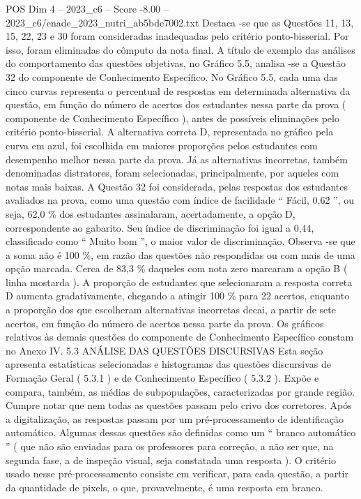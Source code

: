 \begin{textsample}{POS Dim 4 – 2023\_c6 – Score -8.00 – 2023\_c6/enade\_2023\_nutri\_ab5bde7002.txt}
Destaca -se que as Questões 11, 13, 15, 22, 23 e 30 foram consideradas inadequadas pelo critério ponto-bisserial.
Por isso, foram eliminadas do cômputo da nota final.
A título de exemplo das análises do comportamento das questões objetivas, no Gráfico 5.5, analisa -se a Questão 32 do componente de Conhecimento Específico.
No Gráfico 5.5, cada uma das cinco curvas representa o percentual de respostas em determinada alternativa da questão, em função do número de acertos dos estudantes nessa parte da prova ( componente de Conhecimento Específico ), antes de possíveis eliminações pelo critério ponto-bisserial.
A alternativa correta D, representada no gráfico pela curva em azul, foi escolhida em maiores proporções pelos estudantes com desempenho melhor nessa parte da prova.
Já as alternativas incorretas, também denominadas distratores, foram selecionadas, principalmente, por aqueles com notas mais baixas.
A Questão 32 foi considerada, pelas respostas dos estudantes avaliados na prova, como uma questão com índice de facilidade “ Fácil, 0,62 ”, ou seja, 62,0 \% dos estudantes assinalaram, acertadamente, a opção D, correspondente ao gabarito.
Seu índice de discriminação foi igual a 0,44, classificado como “ Muito bom ”, o maior valor de discriminação.
Observa -se que a soma não é 100 \%, em razão das questões não respondidas ou com mais de uma opção marcada.
Cerca de 83,3 \% daqueles com nota zero marcaram a opção B ( linha mostarda ).
A proporção de estudantes que selecionaram a resposta correta D aumenta gradativamente, chegando a atingir 100 \% para 22 acertos, enquanto a proporção dos que escolheram alternativas incorretas decai, a partir de sete acertos, em função do número de acertos nessa parte da prova.
Os gráficos relativos às demais questões do componente de Conhecimento Específico constam no Anexo IV. 5.3 ANÁLISE DAS QUESTÕES DISCURSIVAS Esta seção apresenta estatísticas selecionadas e histogramas das questões discursivas de Formação Geral ( 5.3.1 ) e de Conhecimento Específico ( 5.3.2 ).
Expõe e compara, também, as médias de subpopulações, caracterizadas por grande região.
Cumpre notar que nem todas as questões passam pelo crivo dos corretores.
Após a digitalização, as respostas passam por um pré-processamento de identificação automático.
Algumas dessas questões são definidas como um “ branco automático ” ( que não são enviadas para os professores para correção, a não ser que, na segunda fase, a de inspeção visual, seja constatada uma resposta ).
O critério usado nesse pré-processamento consiste em verificar, para cada questão, a partir da quantidade de pixels, o que, provavelmente, é uma resposta em branco.

\end{textsample}
